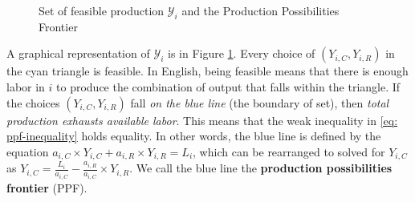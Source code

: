 \documentclass[11pt,letterpaper]{article}
\begin{document}
\begin{figure}[htbp!]
\centering
{}
\caption{Set of feasible production $\mathcal{Y}_i$ and the Production Possibilities Frontier}\label{fig: pp-sets}
\end{figure}
            
A graphical representation of $\mathcal{Y}_i$ is in Figure \ref{fig: pp-sets}. Every choice of $(Y_{i,C}, Y_{i,R})$ in the cyan triangle is feasible. In English, being feasible means that there is enough labor in $i$ to produce the combination of output that falls within the triangle. If the choices $(Y_{i,C}, Y_{i,R})$ fall \textit{on the blue line} (the boundary of set), then \textit{total production exhausts available labor}. This means that the weak inequality in \eqref{eq: ppf-inequality} holds equality. In other words, the blue line is defined by the equation $a_{i,C} \times Y_{i,C} + a_{i,R} \times Y_{i,R} = L_i$, which can be rearranged to solved for $Y_{i,C}$ as $Y_{i,C} = \frac{L_{i}}{a_{i,C}} - \frac{a_{i,R}}{a_{i,C}} \times Y_{i,R}$. We call the blue line the \textbf{production possibilities frontier} (PPF).
\end{document}
